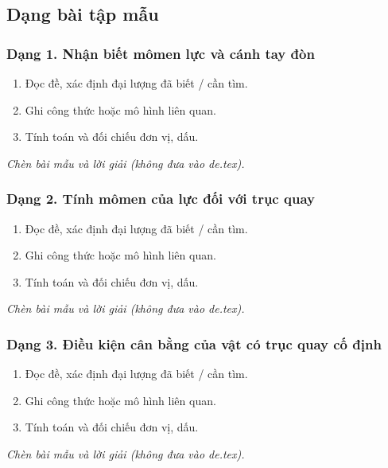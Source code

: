 

\subsection{Dạng bài tập mẫu}
\subsubsection{Dạng 1. Nhận biết mômen lực và cánh tay đòn}
\begin{phuongphap}
\begin{enumerate}
\item Đọc đề, xác định đại lượng đã biết / cần tìm.
\item Ghi công thức hoặc mô hình liên quan.
\item Tính toán và đối chiếu đơn vị, dấu.
\end{enumerate}
\end{phuongphap}
\begin{vidumau}
\textit{Chèn bài mẫu và lời giải (không đưa vào de.tex).}
\end{vidumau}

\subsubsection{Dạng 2. Tính mômen của lực đối với trục quay}
\begin{phuongphap}
\begin{enumerate}
\item Đọc đề, xác định đại lượng đã biết / cần tìm.
\item Ghi công thức hoặc mô hình liên quan.
\item Tính toán và đối chiếu đơn vị, dấu.
\end{enumerate}
\end{phuongphap}
\begin{vidumau}
\textit{Chèn bài mẫu và lời giải (không đưa vào de.tex).}
\end{vidumau}

\subsubsection{Dạng 3. Điều kiện cân bằng của vật có trục quay cố định}
\begin{phuongphap}
\begin{enumerate}
\item Đọc đề, xác định đại lượng đã biết / cần tìm.
\item Ghi công thức hoặc mô hình liên quan.
\item Tính toán và đối chiếu đơn vị, dấu.
\end{enumerate}
\end{phuongphap}
\begin{vidumau}
\textit{Chèn bài mẫu và lời giải (không đưa vào de.tex).}
\end{vidumau}

